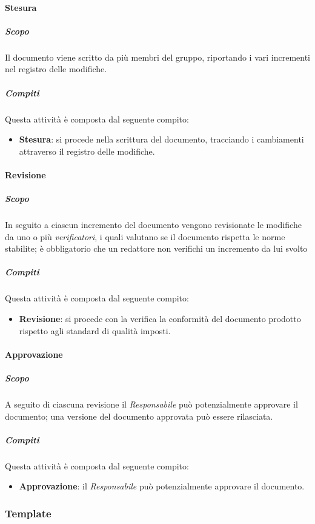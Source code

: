 \paragraph{Stesura}
\label{par:stesura}
\subparagraph{Scopo}
\label{par:stesura:scopo}
Il documento viene scritto da più membri del gruppo, riportando i vari incrementi nel registro delle modifiche.
\subparagraph{Compiti}
\label{par:stesura:compiti}
Questa attività è composta dal seguente compito:
\begin{itemize}
    \item \textbf{Stesura}: si procede nella scrittura del documento, tracciando i cambiamenti attraverso il registro delle modifiche.
\end{itemize}

\paragraph{Revisione}
\label{par:revisione}
\subparagraph{Scopo}
\label{par:revizione:scopo}
In seguito a ciascun incremento del documento vengono revisionate le modifiche da uno o più \emph{verificatori}, i quali valutano se il documento rispetta le norme stabilite; è obbligatorio che un redattore non verifichi un incremento da lui svolto
\subparagraph{Compiti}
\label{par:revisione:compiti}
Questa attività è composta dal seguente compito:
\begin{itemize}
    \item \textbf{Revisione}: si procede con la verifica la conformità del documento prodotto rispetto agli standard di qualità imposti.
\end{itemize}

\paragraph{Approvazione}
\label{par:approvazione}
\subparagraph{Scopo}
\label{par:approvazione:scopo}
A seguito di ciascuna revisione il \emph{Responsabile} può potenzialmente approvare il documento; una versione del documento approvata può essere rilasciata.
\subparagraph{Compiti}
\label{par:approvazione:compiti}
Questa attività è composta dal seguente compito:
\begin{itemize}
    \item \textbf{Approvazione}: il \emph{Responsabile} può potenzialmente approvare il documento.
\end{itemize}


\subsubsection{Template}
\label{ssub:template}

